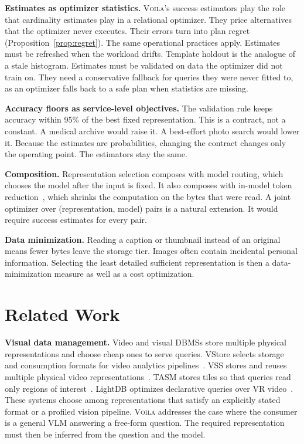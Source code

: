 \documentclass[10pt,conference]{IEEEtran}
\newcommand{\system}{\textsc{Voila}\xspace}
\begin{document}
\textbf{Estimates as optimizer statistics.} \system's success estimators play
the role that cardinality estimates play in a relational optimizer. They price
alternatives that the optimizer never executes. Their errors turn into plan
regret (Proposition~\ref{prop:regret}). The same operational practices apply.
Estimates must be refreshed when the workload drifts. Template holdout is the
analogue of a stale histogram. Estimates must be validated on data the
optimizer did not train on. They need a conservative fallback
for queries they were never fitted to, as an optimizer falls back to a
safe plan when statistics are missing.

\textbf{Accuracy floors as service-level objectives.} The validation rule keeps
accuracy within 95\% of the best fixed representation. This is a contract, not
a constant. A medical archive would raise it. A best-effort photo search would
lower it. Because the estimates are probabilities, changing the contract
changes only the operating point. The estimators stay the same.

\textbf{Composition.} Representation selection composes with model routing,
which chooses the model after the input is fixed. It also composes with
in-model token reduction~\cite{cai2024matryoshka,chen2024fastv}, which shrinks
the computation on the bytes that were read. A joint optimizer over
(representation, model) pairs is a natural extension. It would require success
estimates for every pair.

\textbf{Data minimization.} Reading a caption or thumbnail instead of an
original means fewer bytes leave the storage tier. Images often contain
incidental personal information. Selecting the least detailed sufficient
representation is then a data-minimization measure as well as a cost
optimization.

\section{Related Work}
\label{sec:related}

\textbf{Visual data management.} Video and visual DBMSs store multiple physical
representations and choose cheap ones to serve queries. VStore selects storage
and consumption formats for video analytics pipelines~\cite{xu2019vstore}. VSS
stores and reuses multiple physical video representations~\cite{haynes2021vss}.
TASM stores tiles so that queries read only regions of
interest~\cite{daum2021tasm}. LightDB optimizes declarative queries over VR
video~\cite{haynes2018lightdb}. These systems choose among representations that
satisfy an explicitly stated format or a profiled vision pipeline. \system
addresses the case where the consumer is a general VLM answering a free-form
question. The required representation must then be inferred from the question
and the model.
\end{document}
